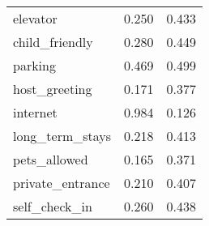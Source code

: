 \begin{table}[htp]
{\begin{tabular}{lrr}
elevator               &     0.250 &        0.433 \\
child\_friendly         &     0.280 &        0.449 \\
parking                &     0.469 &        0.499 \\
host\_greeting          &     0.171 &        0.377 \\
internet               &     0.984 &        0.126 \\
long\_term\_stays        &     0.218 &        0.413 \\
pets\_allowed           &     0.165 &        0.371 \\
private\_entrance       &     0.210 &        0.407 \\
self\_check\_in          &     0.260 &        0.438 \\
\bottomrule
\end{tabular}
}
\end{table}

